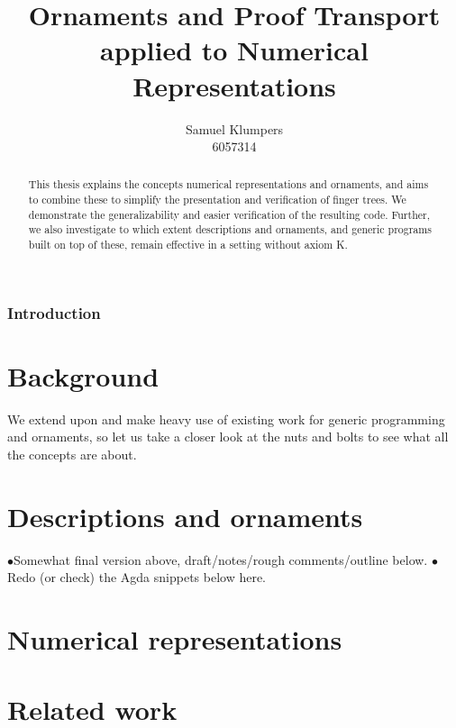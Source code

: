 \documentclass[10pt]{article}
\title{Ornaments and Proof Transport applied to Numerical Representations}
\author{Samuel Klumpers\\6057314}
\theoremstyle{plain}
\theoremstyle{definition}
\newcommand{\changed}[1]{\textcolor{git-orange}{$\bullet$#1}}
\begin{document}
\maketitle

\begin{abstract}
\begin{semicomment}
This thesis explains the concepts numerical representations and ornaments, and aims to combine these to simplify the presentation and verification of finger trees. We demonstrate the generalizability and easier verification of the resulting code. Further, we also investigate to which extent descriptions and ornaments, and generic programs built on top of these, remain effective in a setting without axiom K.
\end{semicomment}
\end{abstract}
    

\tableofcontents

\listoftodos

\section{Introduction}\label{sec:introduction}



\part*{Background}\label{part:background}
We extend upon and make heavy use of existing work for generic programming and ornaments, so let us take a closer look at the nuts and bolts to see what all the concepts are about.




\part{Descriptions and ornaments}\label{part:ornament}
\changed{Somewhat final version above, draft/notes/rough comments/outline below.}
\changed{Redo (or check) the Agda snippets below here.}



\part{Numerical representations}\label{part:numrep}



\part{Related work}\label{part:related}
\end{document}
